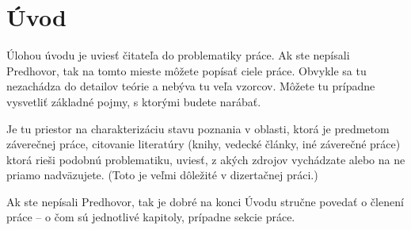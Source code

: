 \chapter{Úvod}

Úlohou úvodu je uviesť čitateľa do problematiky práce. Ak ste nepísali Predhovor, tak na tomto mieste môžete popísať ciele práce. Obvykle sa tu nezachádza do detailov teórie a nebýva tu veľa vzorcov. Môžete tu prípadne vysvetliť základné pojmy, s ktorými budete narábať.

Je tu priestor na charakterizáciu stavu poznania v oblasti, ktorá je predmetom záverečnej práce, citovanie literatúry (knihy, vedecké články, iné záverečné práce) ktorá rieši podobnú problematiku, uviesť, z akých zdrojov vychádzate alebo na ne priamo nadväzujete. (Toto je veľmi dôležité v dizertačnej práci.)

Ak ste nepísali Predhovor, tak je dobré  na konci Úvodu stručne povedať o členení práce -- o čom sú jednotlivé kapitoly, prípadne sekcie práce.
